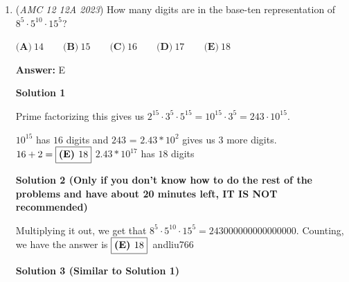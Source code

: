 \begin{enumerate}
 All it takes is to recall that $45$ squared is $2025$, and $45$ is $5 \cdot 9$. So all the squares of $5 \cdot 1, 5 \cdot 2, 5 \cdot 3$ so on are divisible by $5$. So the answer is $8$. It can be done even if one does not remember that $45$ squared is $2025$, all it takes is intuition. One can easily see mentally that $5 \cdot 8$ that is $40$ squared is $1600$, and then one has to do just one more computation and see that $5 \cdot 9$ that is $45$ squared exceeds $2023$, so the answer is $8$. 

 Note that you can find the square of any number that ends in $5$ by taking the number $5$ more than it and the number $5$ less than it, multiplying those together, and adding $25$. For example, to calculate the square of $45$, you do $40 \cdot 50 = 2000$, and $2000 + 25 = 2025$.

 And then you know that it goes up from $1$ to $44$, and the multiples of five are {$5$, $10$..., $35$, $40$}, dividing each of them by $5$, you get {$1$, $2$..., $7$, $8$}, therefore, the answer is $\boxed{\textbf{(A) 8}}$



	\item (\textit{AMC 12 12A 2023}) How many digits are in the base-ten representation of $8^5 \cdot 5^{10} \cdot 15^5$?


 $\textbf{(A)}~14\qquad\textbf{(B)}~15\qquad\textbf{(C)}~16\qquad\textbf{(D)}~17\qquad\textbf{(E)}~18\qquad$

 \textbf{Answer: }E



\textbf{Solution 1}

Prime factorizing this gives us $2^{15}\cdot3^{5}\cdot5^{15}=10^{15}\cdot3^5=243\cdot10^{15}$.

 $10^{15}$ has $16$ digits and $243$ = $2.43*10^{2}$ gives us $3$ more digits. $16+2=\text{\boxed{\textbf{(E) }18}}$
$2.43*10^{17}$ has $18$ digits

 



\textbf{Solution 2 (Only if you don't know how to do the rest of the problems and have about 20 minutes left, IT IS NOT recommended)}

Multiplying it out, we get that $8^5 \cdot 5^{10} \cdot 15^5 = 243000000000000000$. Counting, we have the answer is $\text{\boxed{\textbf{(E) }18}}$~andliu766

 



\textbf{Solution 3 (Similar to Solution 1)}


\end{enumerate}
